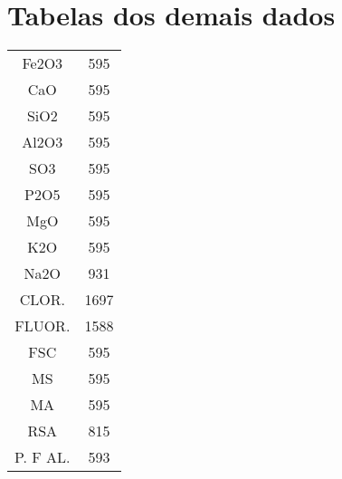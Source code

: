 \pagestyle{appendix}



\chapter{Tabelas dos demais dados}
\label{ape:tables}

\begin{center}
\begin{tabular}{ c c }
Fe2O3     &   595\\
CaO       &  595\\
SiO2      &   595\\
Al2O3     &   595\\
SO3       &   595\\
P2O5      &   595\\
MgO       &   595\\
K2O       &   595\\
Na2O      &   931\\
CLOR.     &  1697\\
FLUOR.    &  1588\\
FSC       &   595\\
MS        &   595\\
MA        &   595\\
RSA       &   815\\
P. F AL.  &   593 \\
\end{tabular}
\end{center}

